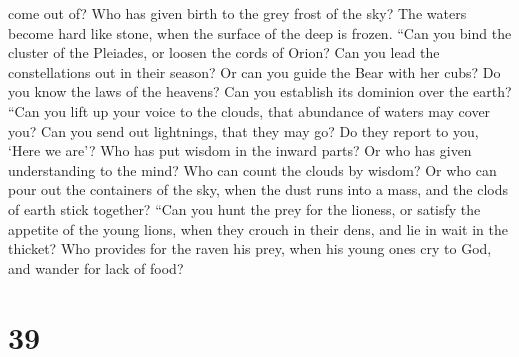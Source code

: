 come out of? Who has given birth to the grey frost of the sky?
 The waters become hard like stone, when the surface of
the deep is frozen.  ``Can you bind the cluster of the
Pleiades, or loosen the cords of Orion?  Can you lead the
constellations out in their season? Or can you guide the Bear with her
cubs?  Do you know the laws of the heavens? Can you
establish its dominion over the earth?  ``Can you lift up
your voice to the clouds, that abundance of waters may cover you?
 Can you send out lightnings, that they may go? Do they
report to you, `Here we are'?  Who has put wisdom in the
inward parts? Or who has given understanding to the mind?
 Who can count the clouds by wisdom? Or who can pour out
the containers of the sky,  when the dust runs into a
mass, and the clods of earth stick together?  ``Can you
hunt the prey for the lioness, or satisfy the appetite of the young
lions,  when they crouch in their dens, and lie in wait
in the thicket?  Who provides for the raven his prey,
when his young ones cry to God, and wander for lack of food?

\hypertarget{section-38}{%
\section{39}\label{section-38}}

